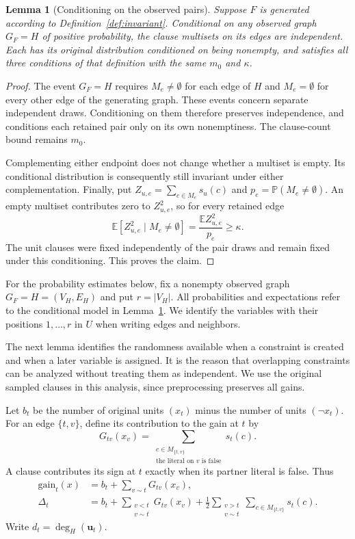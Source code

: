 \documentclass[11pt,a4paper]{article}
\newtheorem{lemma}[theorem]{Lemma}
\theoremstyle{definition}
\theoremstyle{remark}
\newcommand{\E}{\mathbb E}
\newcommand{\Prb}{\mathbb P}
\begin{document}
\begin{lemma}[Conditioning on the observed pairs]\label{lem:observed_pairs}
Suppose $F$ is generated according to Definition~\ref{def:invariant}.
Conditional on any observed graph $G_F=H$ of positive probability, the
clause multisets on its edges are independent. Each has its original
distribution conditioned on being nonempty, and satisfies all three
conditions of that definition with the same $m_0$ and $\kappa$.
\end{lemma}
\begin{proof}
The event $G_F=H$ requires $M_e\ne\emptyset$ for each edge of $H$ and
$M_e=\emptyset$ for every other edge of the generating graph. These events
concern separate independent draws. Conditioning on them therefore
preserves independence, and conditions each retained pair only on its
own nonemptiness. The clause-count bound remains $m_0$.

Complementing either endpoint does not change whether a multiset is
empty. Its conditional distribution is consequently still invariant
under either complementation. Finally, put
$Z_{u,e}=\sum_{c\in M_e}s_u(c)$ and
$p_e=\Prb(M_e\ne\emptyset)$. An empty multiset contributes zero to
$Z_{u,e}^2$, so for every retained edge
\[
 \E[Z_{u,e}^2\mid M_e\ne\emptyset]
 =\frac{\E Z_{u,e}^2}{p_e}\ge\kappa.
\]
The unit clauses were fixed independently of the pair draws and remain
fixed under this conditioning. This proves the claim.
\end{proof}

For the probability estimates below, fix a nonempty observed graph
$G_F=H=(V_H,E_H)$ and put $r=|V_H|$. All probabilities and expectations
refer to the conditional model in Lemma~\ref{lem:observed_pairs}.
We identify the variables with their positions $1,\ldots,r$ in $U$
when writing edges and neighbors.

The next lemma identifies the randomness available when a constraint is
created and when a later variable is assigned. It is the reason that
overlapping constraints can be analyzed without treating them as
independent. We use the original sampled clauses in this analysis, since
preprocessing preserves all gains.

Let $b_t$ be the number of original units $(x_t)$ minus the number of
units $(\neg x_t)$. For an edge $\{t,v\}$, define its contribution to
the gain at $t$ by
\[
 G_{tv}(x_v)=
 \sum_{\substack{c\in M_{\{t,v\}}\\
                 \text{the literal on }v\text{ is false}}}s_t(c).
\]
A clause contributes its sign at $t$ exactly when its partner literal
is false. Thus
\begin{align*}
 \mathrm{gain}_t(x)&=b_t+\sum_{v\sim t}G_{tv}(x_v),\\
 \Delta_t&=b_t+\sum_{\substack{v<t\\v\sim t}}G_{tv}(x_v)
       +\frac12\sum_{\substack{v>t\\v\sim t}}\sum_{c\in M_{\{t,v\}}}s_t(c).
\end{align*}
Write $d_t=\deg_H(\mathbf u_t)$.
\end{document}
